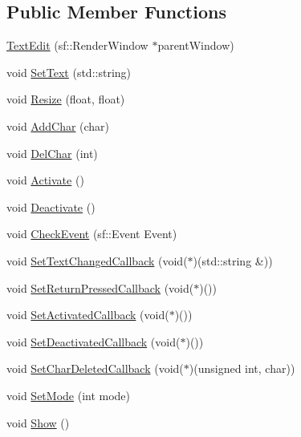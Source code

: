 \subsection*{Public Member Functions}
\begin{CompactItemize}
\item 
\hyperlink{classsfgui_1_1TextEdit_c6f2d938ccf876f05a9a9c47060c6093}{TextEdit} (sf::RenderWindow $\ast$parentWindow)
\item 
void \hyperlink{classsfgui_1_1TextEdit_c6f06a7dc81611a50226e10287e87e1e}{SetText} (std::string)
\item 
void \hyperlink{classsfgui_1_1TextEdit_58afd20cc7cec80bf02603cc5e47143a}{Resize} (float, float)
\item 
void \hyperlink{classsfgui_1_1TextEdit_203952f38ce3bd68695597fee4b4397b}{AddChar} (char)
\item 
void \hyperlink{classsfgui_1_1TextEdit_dc95dab7bac1c41d0cebff1268f80c22}{DelChar} (int)
\item 
void \hyperlink{classsfgui_1_1TextEdit_bcd256e053ae8f13a5c7f919f79c03c9}{Activate} ()
\item 
void \hyperlink{classsfgui_1_1TextEdit_49b0919fd6c43c35913f8a46a6788270}{Deactivate} ()
\item 
void \hyperlink{classsfgui_1_1TextEdit_af6d4be3633d3eb8bcc7a1007e324da8}{CheckEvent} (sf::Event Event)
\item 
void \hyperlink{classsfgui_1_1TextEdit_2c80f417ea995a6452fcb47740701e1e}{SetTextChangedCallback} (void($\ast$)(std::string \&))
\item 
void \hyperlink{classsfgui_1_1TextEdit_b60f88cc667196bb073091e8878483f4}{SetReturnPressedCallback} (void($\ast$)())
\item 
void \hyperlink{classsfgui_1_1TextEdit_68bda298b3563eb960e77c3712664db8}{SetActivatedCallback} (void($\ast$)())
\item 
void \hyperlink{classsfgui_1_1TextEdit_6d75bcac8949d08513caa72e898e9b43}{SetDeactivatedCallback} (void($\ast$)())
\item 
void \hyperlink{classsfgui_1_1TextEdit_02d743ef07c871b2ce4666083157628c}{SetCharDeletedCallback} (void($\ast$)(unsigned int, char))
\item 
void \hyperlink{classsfgui_1_1TextEdit_214a2f7f8dae54527ca354956ec4f06c}{SetMode} (int mode)
\item 
void \hyperlink{classsfgui_1_1TextEdit_1ee03247816213b34caaff365b160de0}{Show} ()
\end{CompactItemize}

